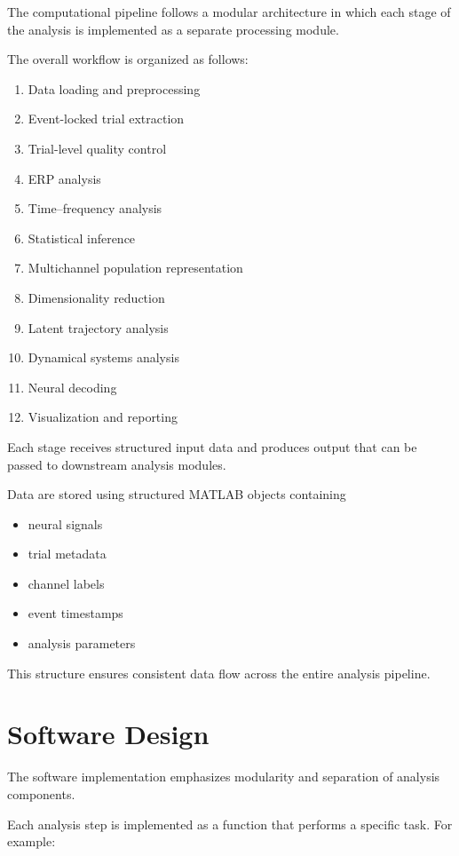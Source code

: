 \documentclass[11pt]{report}
\begin{document}
The computational pipeline follows a modular architecture in which
each stage of the analysis is implemented as a separate processing
module.

The overall workflow is organized as follows:

\begin{enumerate}
\item Data loading and preprocessing
\item Event-locked trial extraction
\item Trial-level quality control
\item ERP analysis
\item Time--frequency analysis
\item Statistical inference
\item Multichannel population representation
\item Dimensionality reduction
\item Latent trajectory analysis
\item Dynamical systems analysis
\item Neural decoding
\item Visualization and reporting
\end{enumerate}

Each stage receives structured input data and produces output that
can be passed to downstream analysis modules.

Data are stored using structured MATLAB objects containing

\begin{itemize}
\item neural signals
\item trial metadata
\item channel labels
\item event timestamps
\item analysis parameters
\end{itemize}

This structure ensures consistent data flow across the entire
analysis pipeline.

\section{Software Design}

The software implementation emphasizes modularity and separation
of analysis components.

Each analysis step is implemented as a function that performs a
specific task. For example:
\end{document}

